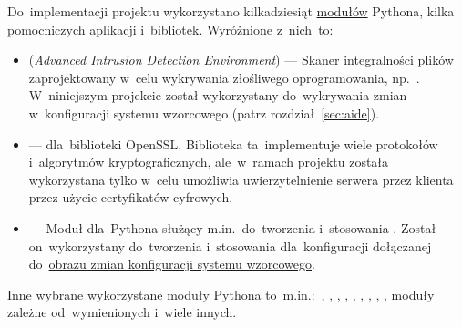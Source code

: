 \documentclass[thesis]{subfiles}
\begin{document}
Do~implementacji projektu wykorzystano kilkadziesiąt \href{https://docs.python.org/dev/tutorial/modules.html}{modułów} Pythona, kilka pomocniczych aplikacji i~bibliotek. Wyróżnione z~nich~to:\mynobreakpar %
\begin{itemize}
	\item {} (\emph{Advanced Intrusion Detection Environment}) --- Skaner integralności plików zaprojektowany w~celu wykrywania złośliwego oprogramowania, np.~. W~niniejszym projekcie został wykorzystany do~wykrywania zmian w~konfiguracji systemu wzorcowego (patrz rozdział~\ref{sec:aide}).
	\item {} ---  dla~biblioteki OpenSSL. Biblioteka ta~implementuje wiele protokołów i~algorytmów kryptograficznych, ale~w~ramach projektu została wykorzystana tylko w~celu umożliwia uwierzytelnienie serwera przez klienta przez użycie certyfikatów cyfrowych.
	\item {} --- Moduł dla~Pythona służący m.in.~do~tworzenia i~stosowania . Został on~wykorzystany do~tworzenia i~stosowania  dla~konfiguracji dołączanej do~\hyperref[sec:obraz-zmian-konfiguracji]{obrazu zmian konfiguracji systemu wzorcowego}.
\end{itemize}

Inne wybrane wykorzystane moduły Pythona to~m.in.:~, , , , , , , , , moduły zależne od~wymienionych i~wiele innych.

\end{document}
